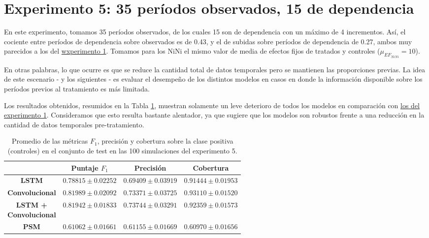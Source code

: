 \documentclass[../../main.tex]{subfiles}
\begin{document}
\section{Experimento 5: 35 períodos observados, 15 de dependencia} \label{sec:exp5}
En este experimento, tomamos 35 períodos observados, de los cuales 15 son de dependencia
con un máximo de 4 incrementos. Así, el cociente entre períodos de dependencia sobre
observados es de 0.43, y el de subidas sobre períodos de dependencia de 0.27, ambos muy
parecidos a los del \hyperref[sec:exp1]{wxperimento 1}. Tomamos para los NiNi el mismo
valor de media de efectos fijos de tratados y controles (\(\mu_{{EF}_{NiNi}} = 10\)).

En otras palabras, lo que ocurre es que se reduce la cantidad total de datos temporales
pero se mantienen las proporciones previas. La idea de este escenario - y los siguientes -
es evaluar el desempeño de los distintos modelos en casos en donde la información
disponible sobre los períodos previos al tratamiento es más limitada.

Los resultados obtenidos, resumidos en la Tabla \ref{tab:results_exp5}, muestran solamente
un leve deterioro de todos los modelos en comparación con \hyperref[tab:results_exp1]{los
del experimento 1}. Consideramos que esto resulta bastante alentador, ya que sugiere que
los modelos son robustos frente a una reducción en la cantidad de datos temporales
pre-tratamiento.

\begin{table}[H]
    \centering
    \renewcommand{\arraystretch}{1.2}
    \begin{tabular}{|c|c|c|c|}
        \hline
         & \textbf{Puntaje} \(F_1\) & \textbf{Precisión} & \textbf{Cobertura} \\ \hline\hline
        \textbf{LSTM}
            & $0.78815 \pm 0.02252$ & $0.69409 \pm 0.03919$ & $0.91444 \pm 0.01953$ \\ \hline
        \textbf{Convolucional}
            & $\mathbf{0.81989 \pm 0.02092}$ & $0.73371 \pm 0.03725$ & $\mathbf{0.93110 \pm 0.01520}$ \\ \hline
        \makecell{\textbf{LSTM +} \\ \textbf{Convolucional}}
            & $0.81942 \pm 0.01833$ & $\mathbf{0.73744 \pm 0.03291}$ & $0.92359 \pm 0.01573$ \\ \hline
        \textbf{PSM}
            & $0.61062 \pm 0.01661$ & $0.61155 \pm 0.01669$ & $0.60970 \pm 0.01656$ \\
        \hline
    \end{tabular}
    \caption{Promedio de las métricas \(F_1\), precisión y cobertura sobre la
    clase positiva (controles) en el conjunto de test en las 100 simulaciones del
    experimento 5.}
    \label{tab:results_exp5}
\end{table}
\end{document}
